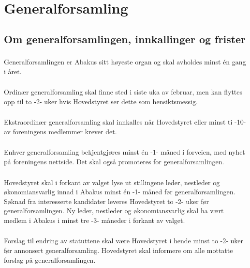\section{Generalforsamling}
\subsection{Om generalforsamlingen, innkallinger og frister}
\subsubsection{}
Generalforsamlingen er Abakus sitt høyeste organ og skal avholdes minst én
gang i året.

\subsubsection{}
Ordinær generalforsamling skal finne sted i siste uka av februar,
men kan flyttes opp til to -2- uker hvis Hovedstyret ser dette som hensiktsmessig.

\subsubsection{}
Ekstraordinær generalforsamling skal innkalles når Hovedstyret eller minst
ti -10- av foreningens medlemmer krever det.

\subsubsection{}
Enhver generalforsamling bekjentgjøres minst én -1- måned i forveien, med
nyhet på foreningens nettside. Det skal også promoteres for generalforsamlingen.

\subsubsection{}
Hovedstyret skal i forkant av valget lyse ut stillingene leder, nestleder og
økonomiansvarlig innad i Abakus minst én -1- måned før generalforsamlingen.
Søknad fra interesserte kandidater leveres Hovedstyret to -2- uker før
generalforsamlingen. Ny leder, nestleder og økonomiansvarlig skal ha vært medlem
i Abakus i minst tre -3- måneder i forkant av valget.

\subsubsection{}
Forslag til endring av statuttene skal være Hovedstyret i hende minst to -2-
uker før annonsert generalforsamling. Hovedstyret skal informere om alle
mottatte forslag på generalforsamlingen.

